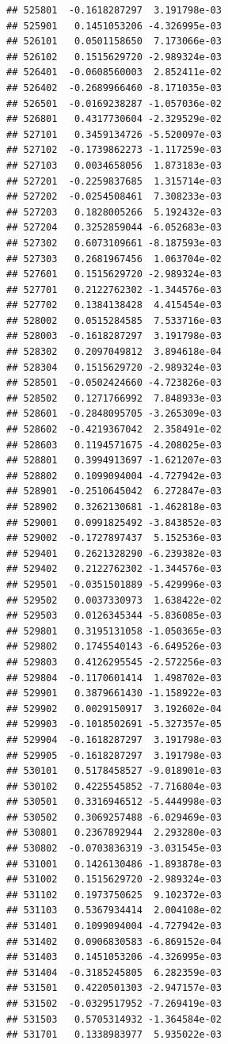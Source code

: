 \begin{frame}[fragile]
\begin{verbatim}
## 525801  -0.1618287297  3.191798e-03
## 525901   0.1451053206 -4.326995e-03
## 526101   0.0501158650  7.173066e-03
## 526102   0.1515629720 -2.989324e-03
## 526401  -0.0608560003  2.852411e-02
## 526402  -0.2689966460 -8.171035e-03
## 526501  -0.0169238287 -1.057036e-02
## 526801   0.4317730604 -2.329529e-02
## 527101   0.3459134726 -5.520097e-03
## 527102  -0.1739862273 -1.117259e-03
## 527103   0.0034658056  1.873183e-03
## 527201  -0.2259837685  1.315714e-03
## 527202  -0.0254508461  7.308233e-03
## 527203   0.1828005266  5.192432e-03
## 527204   0.3252859044 -6.052683e-03
## 527302   0.6073109661 -8.187593e-03
## 527303   0.2681967456  1.063704e-02
## 527601   0.1515629720 -2.989324e-03
## 527701   0.2122762302 -1.344576e-03
## 527702   0.1384138428  4.415454e-03
## 528002   0.0515284585  7.533716e-03
## 528003  -0.1618287297  3.191798e-03
## 528302   0.2097049812  3.894618e-04
## 528304   0.1515629720 -2.989324e-03
## 528501  -0.0502424660 -4.723826e-03
## 528502   0.1271766992  7.848933e-03
## 528601  -0.2848095705 -3.265309e-03
## 528602  -0.4219367042  2.358491e-02
## 528603   0.1194571675 -4.208025e-03
## 528801   0.3994913697 -1.621207e-03
## 528802   0.1099094004 -4.727942e-03
## 528901  -0.2510645042  6.272847e-03
## 528902   0.3262130681 -1.462818e-03
## 529001   0.0991825492 -3.843852e-03
## 529002  -0.1727897437  5.152536e-03
## 529401   0.2621328290 -6.239382e-03
## 529402   0.2122762302 -1.344576e-03
## 529501  -0.0351501889 -5.429996e-03
## 529502   0.0037330973  1.638422e-02
## 529503   0.0126345344 -5.836085e-03
## 529801   0.3195131058 -1.050365e-03
## 529802   0.1745540143 -6.649526e-03
## 529803   0.4126295545 -2.572256e-03
## 529804  -0.1170601414  1.498702e-03
## 529901   0.3879661430 -1.158922e-03
## 529902   0.0029150917  3.192602e-04
## 529903  -0.1018502691 -5.327357e-05
## 529904  -0.1618287297  3.191798e-03
## 529905  -0.1618287297  3.191798e-03
## 530101   0.5178458527 -9.018901e-03
## 530102   0.4225545852 -7.716804e-03
## 530501   0.3316946512 -5.444998e-03
## 530502   0.3069257488 -6.029469e-03
## 530801   0.2367892944  2.293280e-03
## 530802  -0.0703836319 -3.031545e-03
## 531001   0.1426130486 -1.893878e-03
## 531002   0.1515629720 -2.989324e-03
## 531102   0.1973750625  9.102372e-03
## 531103   0.5367934414  2.004108e-02
## 531401   0.1099094004 -4.727942e-03
## 531402   0.0906830583 -6.869152e-04
## 531403   0.1451053206 -4.326995e-03
## 531404  -0.3185245805  6.282359e-03
## 531501   0.4220501303 -2.947157e-03
## 531502  -0.0329517952 -7.269419e-03
## 531503   0.5705314932 -1.364584e-02
## 531701   0.1338983977  5.935022e-03

\end{verbatim}
\end{frame}
